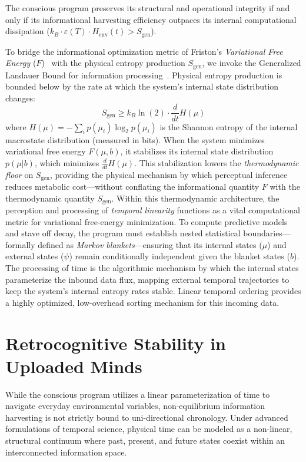 \documentclass[twocolumn, 10pt, journal, letterpaper]{IEEEtran}
\begin{document}
The conscious program preserves its structural and operational integrity if and only if its informational harvesting efficiency outpaces its internal computational dissipation ($k_B \cdot \varepsilon(T) \cdot H_{\text{env}}(t) > S_{\text{gen}}$). 

To bridge the informational optimization metric of Friston's \textit{Variational Free Energy} ($F$)~\cite{friston2010} with the physical entropy production $S_{\text{gen}}$, we invoke the Generalized Landauer Bound for information processing~\cite{landauer1961}. Physical entropy production is bounded below by the rate at which the system's internal state distribution changes:
\begin{equation}
S_{\text{gen}} \ge k_B \ln(2) \cdot \frac{d}{dt} H(\mu)
\label{eq:landauer_bound}
\end{equation}
where $H(\mu) = -\sum_i p(\mu_i) \log_2 p(\mu_i)$ is the Shannon entropy of the internal macrostate distribution (measured in bits). When the system minimizes variational free energy $F(\mu, b)$, it stabilizes its internal state distribution $p(\mu|b)$, which minimizes $\frac{d}{dt}H(\mu)$. This stabilization lowers the \textit{thermodynamic floor} on $S_{\text{gen}}$, providing the physical mechanism by which perceptual inference reduces metabolic cost---without conflating the informational quantity $F$ with the thermodynamic quantity $S_{\text{gen}}$.
Within this thermodynamic architecture, the perception and processing of \textit{temporal linearity} functions as a vital computational metric for variational free-energy minimization. To compute predictive models and stave off decay, the program must establish nested statistical boundaries---formally defined as \textit{Markov blankets}---ensuring that its internal states ($\mu$) and external states ($\psi$) remain conditionally independent given the blanket states ($b$). The processing of time is the algorithmic mechanism by which the internal states parameterize the inbound data flux, mapping external temporal trajectories to keep the system's internal entropy rates stable. Linear temporal ordering provides a highly optimized, low-overhead sorting mechanism for this incoming data.

\section{Retrocognitive Stability in Uploaded Minds}
\label{sec:retrocausal}
While the conscious program utilizes a linear parameterization of time to navigate everyday environmental variables, non-equilibrium information harvesting is not strictly bound to uni-directional chronology. Under advanced formulations of temporal science, physical time can be modeled as a non-linear, structural continuum where past, present, and future states coexist within an interconnected information space. 
\end{document}
